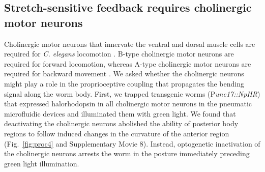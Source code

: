 \subsection{Stretch-sensitive feedback requires cholinergic motor neurons }
 
Cholinergic motor neurons that innervate the ventral and dorsal muscle cells are required for \textit{C. elegans} locomotion \citep{chalfie_neural_1985,leifer_optogenetic_2011}. B-type cholinergic motor neurons are required for forward 
locomotion, whereas A-type cholinergic motor neurons are required for backward movement 
\citep{chalfie_neural_1985}. We asked whether the cholinergic neurons might play a role in the proprioceptive coupling  that propagates the bending signal along the worm body. First, we trapped transgenic worms 
(P\textit{unc17::NpHR}) that expressed halorhodopsin in all cholinergic motor neurons in the pneumatic 
microfluidic devices and illuminated them with green light. We found that deactivating the 
cholinergic neurons abolished the ability of posterior body regions to follow induced changes in 
the curvature of the anterior region (Fig.~\ref{fig:proc4} and Supplementary Movie 8). Instead, optogenetic 
inactivation of the cholinergic neurons arrests the worm in the posture immediately preceding 
green light illumination.  



